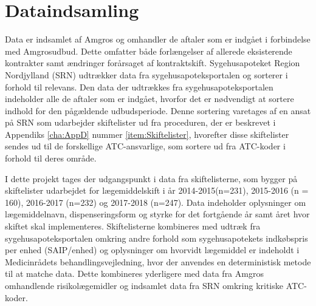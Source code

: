 \section{Dataindsamling}
Data er indsamlet af Amgros og omhandler de aftaler som er indgået i forbindelse med Amgrosudbud. Dette omfatter både forlængelser af allerede eksisterende kontrakter samt ændringer forårsaget af kontraktskift. Sygehusapoteket Region Nordjylland (SRN) udtrækker data fra sygehusapoteksportalen og sorterer i forhold til relevans. Den data der udtrækkes fra sygehusapoteksportalen indeholder alle de aftaler som er indgået, hvorfor det er nødvendigt at sortere indhold for den pågældende udbudsperiode. Denne sortering varetages af en ansat på SRN som udarbejder skiftelister ud fra proceduren, der er beskrevet i Appendiks \ref{cha:AppD} nummer \ref{item:Skiftelister}, hvorefter disse skiftelister sendes ud til de forskellige ATC-ansvarlige, som sortere ud fra ATC-koder i forhold til deres område.

I dette projekt tages der udgangspunkt i data fra skiftelisterne, som bygger på skiftelister udarbejdet for lægemiddelskift i år 2014-2015(n=231), 2015-2016 (n = 160), 2016-2017 (n=232) og 2017-2018 (n=247). Data indeholder oplysninger om lægemiddelnavn, dispenseringsform og styrke for det fortgående år samt året hvor skiftet skal implementeres. Skiftelisterne kombineres med udtræk fra sygehusapoteksportalen omkring andre forhold som sygehusapotekets indkøbspris per enhed (SAIP/enhed) og oplysninger om hvorvidt lægemiddel er indeholdt i Medicinrådets behandlingsvejledning, hvor der anvendes en deterministisk metode til at matche data. Dette kombineres yderligere med data fra Amgros omhandlende risikolægemidler og indsamlet data fra SRN omkring kritiske ATC-koder.





